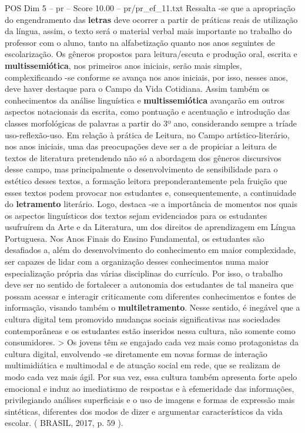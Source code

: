 \begin{textsample}{POS Dim 5 – pr – Score 10.00 – pr/pr\_ef\_11.txt}
Ressalta -se que a apropriação do engendramento das \textbf{letras} deve ocorrer a partir de práticas reais de utilização da língua, assim, o texto será o material verbal mais importante no trabalho do professor com o aluno, tanto na alfabetização quanto nos anos seguintes de escolarização.
Os gêneros propostos para leitura/escuta e produção oral, escrita e \textbf{multissemiótica}, nos primeiros anos iniciais, serão mais simples, complexificando -se conforme se avança nos anos iniciais, por isso, nesses anos, deve haver destaque para o Campo da Vida Cotidiana.
Assim também os conhecimentos da análise linguística e \textbf{multissemiótica} avançarão em outros aspectos notacionais da escrita, como pontuação e acentuação e introdução das classes morfológicas de palavras a partir do 3º ano, considerando sempre a tríade uso-reflexão-uso.
Em relação à prática de Leitura, no Campo artístico-literário, nos anos iniciais, uma das preocupações deve ser a de propiciar a leitura de textos de literatura pretendendo não só a abordagem dos gêneros discursivos desse campo, mas principalmente o desenvolvimento de sensibilidade para o estético desses textos, a formação leitora preponderantemente pela fruição que esses textos podem provocar nos estudantes e, consequentemente, a continuidade do \textbf{letramento} literário.
Logo, destaca -se a importância de momentos nos quais os aspectos linguísticos dos textos sejam evidenciados para os estudantes usufruírem da Arte e da Literatura, um dos direitos de aprendizagem em Língua Portuguesa.
Nos Anos Finais do Ensino Fundamental, os estudantes são desafiados a, além do desenvolvimento do conhecimento em maior complexidade, ser capazes de lidar com a organização desses conhecimentos numa maior especialização própria das várias disciplinas do currículo.
Por isso, o trabalho deve ser no sentido de fortalecer a autonomia dos estudantes de tal maneira que possam acessar e interagir criticamente com diferentes conhecimentos e fontes de informação, visando também o \textbf{multiletramento}.
Nesse sentido, é inegável que a cultura digital tem promovido mudanças sociais significativas nas sociedades contemporâneas e os estudantes estão inseridos nessa cultura, não somente como consumidores. > Os jovens têm se engajado cada vez mais como protagonistas da cultura digital, envolvendo -se diretamente em novas formas de interação multimidiática e multimodal e de atuação social em rede, que se realizam de modo cada vez mais ágil.
Por sua vez, essa cultura também apresenta forte apelo emocional e induz ao imediatismo de respostas e à efemeridade das informações, privilegiando análises superficiais e o uso de imagens e formas de expressão mais sintéticas, diferentes dos modos de dizer e argumentar característicos da vida escolar. ( BRASIL, 2017, p. 59 ).

\end{textsample}
